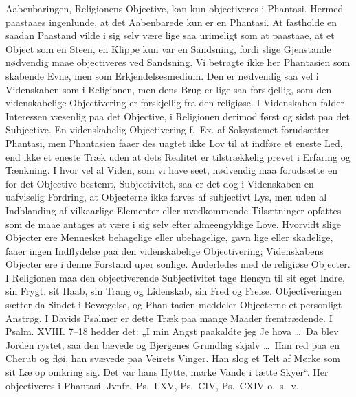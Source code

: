 \documentclass[12pt,a4paper]{article}
\newcommand{\opage}[1]{\marginnote{\footnotesize\textit{[#1]}}}
\begin{document}
\opage{9}Aabenbaringen, Religionens Objective, kan kun objectiveres i
Phantasi. Hermed paastaaes ingenlunde, at det Aabenbarede kun
er en Phantasi. At fastholde en saadan Paastand vilde i sig selv
være lige saa urimeligt som at paastaae, at et Object som en
Steen, en Klippe kun var en Sandsning, fordi slige Gjenstande
nødvendig maae objectiveres ved Sandsning. Vi betragte ikke her
Phantasien som skabende Evne, men som Erkjendelsesmedium.
Den er nødvendig saa vel i Videnskaben som i Religionen,
men dens Brug er lige saa forskjellig, som den videnskabelige
Objectivering er forskjellig fra den religiøse. I Videnskaben falder
Interessen væsenlig paa det Objective, i Religionen derimod først
og sidst paa det Subjective. En videnskabelig Objectivering f.\ Ex.
af Solsystemet forudsætter Phantasi, men Phantasien faaer des\-%
uagtet ikke Lov til at indføre et eneste Led, end ikke et eneste
Træk uden at dets Realitet er tilstrækkelig prøvet i Erfaring og
Tænkning. I hvor vel al Viden, som vi have seet, nødvendig
maa forudsætte en for det Objective bestemt, Subjectivitet, saa er det
dog i Videnskaben en uafviselig Fordring, at Objecterne ikke
farves af subjectivt Lys, men uden al Indblanding af vilkaarlige
Elementer eller uvedkommende Tilsætninger opfattes som de maae
antages at være i sig selv efter almeengyldige Love. Hvorvidt
slige Objecter ere Mennesket behagelige eller ubehagelige, gavn\-%
lige eller skadelige, faaer ingen Indflydelse paa den videnskabelige
Objectivering; Videnskabens Objecter ere i denne Forstand uper\-%
sonlige. Anderledes med de religiøse Objecter. I Religionen
maa den objectiverende Subjectivitet tage Hensyn til sit eget
Indre, sin Frygt. sit Haab, sin Trang og Lidenskab, sin Fred og
Frelse. Objectiveringen sætter da Sindet i Bevægelse, og Phan\-%
tasien meddeler Objecterne et personligt Anstrøg. I Davids
Psalmer er dette Træk paa mange Maader fremtrædende. I Psalm.
XVIII. 7--18 hedder det: „I min Angst paakaldte jeg Je\-%
hova \ldots\ Da blev Jorden rystet, saa den bævede og Bjergenes
Grundlag skjalv \ldots\ Han red paa en Cherub og fløi, han svævede
paa Veirets Vinger. Han slog et Telt af Mørke som sit Læ op
\opage{10}omkring sig. Det var hans Hytte, mørke Vande i tætte Skyer“.
Her objectiveres i Phantasi. Jvnfr.\ Ps.\ LXV, Ps.\ CIV, Ps.\ CXIV o.\ s.\ v.
\end{document}
